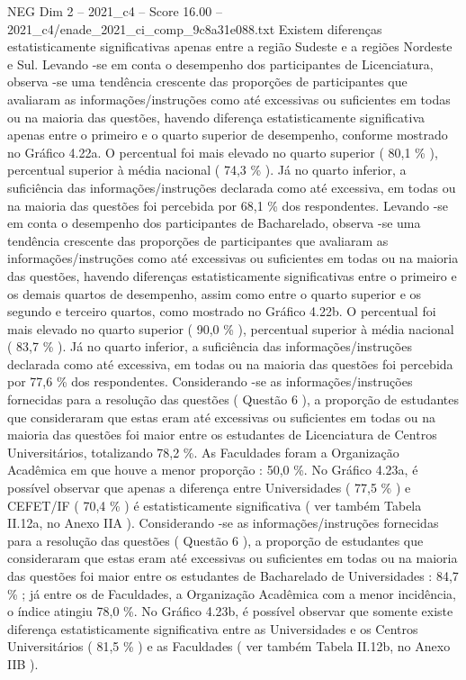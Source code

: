 \begin{textsample}{NEG Dim 2 – 2021\_c4 – Score 16.00 – 2021\_c4/enade\_2021\_ci\_comp\_9c8a31e088.txt}
Existem diferenças estatisticamente significativas apenas entre a região Sudeste e a regiões Nordeste e Sul.
Levando -se em conta o desempenho dos participantes de Licenciatura, observa -se uma tendência crescente das proporções de participantes que avaliaram as informações/instruções como até excessivas ou suficientes em todas ou na maioria das questões, havendo diferença estatisticamente significativa apenas entre o primeiro e o quarto superior de desempenho, conforme mostrado no Gráfico 4.22a.
O percentual foi mais elevado no quarto superior ( 80,1 \% ), percentual superior à média nacional ( 74,3 \% ).
Já no quarto inferior, a suficiência das informações/instruções declarada como até excessiva, em todas ou na maioria das questões foi percebida por 68,1 \% dos respondentes.
Levando -se em conta o desempenho dos participantes de Bacharelado, observa -se uma tendência crescente das proporções de participantes que avaliaram as informações/instruções como até excessivas ou suficientes em todas ou na maioria das questões, havendo diferenças estatisticamente significativas entre o primeiro e os demais quartos de desempenho, assim como entre o quarto superior e os segundo e terceiro quartos, como mostrado no Gráfico 4.22b.
O percentual foi mais elevado no quarto superior ( 90,0 \% ), percentual superior à média nacional ( 83,7 \% ).
Já no quarto inferior, a suficiência das informações/instruções declarada como até excessiva, em todas ou na maioria das questões foi percebida por 77,6 \% dos respondentes.
Considerando -se as informações/instruções fornecidas para a resolução das questões ( Questão 6 ), a proporção de estudantes que consideraram que estas eram até excessivas ou suficientes em todas ou na maioria das questões foi maior entre os estudantes de Licenciatura de Centros Universitários, totalizando 78,2 \%.
As Faculdades foram a Organização Acadêmica em que houve a menor proporção : 50,0 \%.
No Gráfico 4.23a, é possível observar que apenas a diferença entre Universidades ( 77,5 \% ) e CEFET/IF ( 70,4 \% ) é estatisticamente significativa ( ver também Tabela II.12a, no Anexo IIA ).
Considerando -se as informações/instruções fornecidas para a resolução das questões ( Questão 6 ), a proporção de estudantes que consideraram que estas eram até excessivas ou suficientes em todas ou na maioria das questões foi maior entre os estudantes de Bacharelado de Universidades : 84,7 \% ; já entre os de Faculdades, a Organização Acadêmica com a menor incidência, o índice atingiu 78,0 \%.
No Gráfico 4.23b, é possível observar que somente existe diferença estatisticamente significativa entre as Universidades e os Centros Universitários ( 81,5 \% ) e as Faculdades ( ver também Tabela II.12b, no Anexo IIB ).

\end{textsample}
